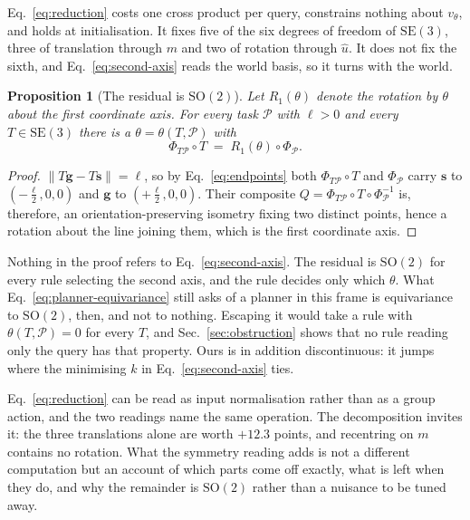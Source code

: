 \documentclass[conference]{IEEEtran}
\newcommand{\SE}{\mathrm{SE}(3)}
\newcommand{\svec}{\mathbf{s}}
\newcommand{\gvec}{\mathbf{g}}
\newtheorem{proposition}{Proposition}
\begin{document}
Eq.~\eqref{eq:reduction} costs one cross product per query, constrains nothing
about $v_\theta$, and holds at initialisation. It fixes five of the six degrees
of freedom of $\SE$, three of translation through $m$ and two of rotation
through $\hat{u}$. It does not fix the sixth, and
Eq.~\eqref{eq:second-axis} reads the world basis, so it turns with the world.

\begin{proposition}[The residual is $\mathrm{SO}(2)$]
\label{prop:residual}
Let $R_1(\theta)$ denote the rotation by $\theta$ about the first coordinate
axis. For every task $\mathcal{P}$ with $\ell > 0$ and every $T \in \SE$ there is a
$\theta = \theta(T, \mathcal{P})$ with
\begin{equation}
  \Phi_{T\mathcal{P}} \circ T \;=\; R_1(\theta) \circ \Phi_{\mathcal{P}} .
  \label{eq:residual}
\end{equation}
\end{proposition}
\begin{proof}
$\|T\gvec - T\svec\| = \ell$, so by Eq.~\eqref{eq:endpoints} both
$\Phi_{T\mathcal{P}} \circ T$ and $\Phi_{\mathcal{P}}$ carry $\svec$ to
$(-\tfrac{\ell}{2},0,0)$ and $\gvec$ to $(+\tfrac{\ell}{2},0,0)$. Their composite
$Q = \Phi_{T\mathcal{P}} \circ T \circ \Phi_{\mathcal{P}}^{-1}$ is, therefore, an
orientation-preserving isometry fixing two distinct points, hence a rotation
about the line joining them, which is the first coordinate axis.
\end{proof}

Nothing in the proof refers to Eq.~\eqref{eq:second-axis}. The residual is
$\mathrm{SO}(2)$ for every rule selecting the second axis, and the rule decides
only which $\theta$. What Eq.~\eqref{eq:planner-equivariance} still asks of a
planner in this frame is equivariance to $\mathrm{SO}(2)$, then, and not to
nothing. Escaping it would take a rule with $\theta(T,\mathcal{P}) = 0$ for every $T$,
and Sec.~\ref{sec:obstruction} shows that no rule reading only the query has
that property. Ours is in addition discontinuous: it jumps where the minimising
$k$ in Eq.~\eqref{eq:second-axis} ties.

Eq.~\eqref{eq:reduction} can be read as input normalisation rather than as a
group action, and the two readings name the same operation. The decomposition
invites it: the three translations alone are worth $+12.3$ points, and recentring
on $m$ contains no rotation. What the symmetry reading adds is not a different
computation but an account of which parts come off exactly, what is left when
they do, and why the remainder is $\mathrm{SO}(2)$ rather than a nuisance to be
tuned away.
\end{document}
